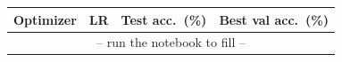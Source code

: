 \begin{tabular}{llcc}
\toprule
Optimizer & LR & Test acc.\ (\%) & Best val acc.\ (\%) \\
\midrule
\multicolumn{4}{c}{-- run the notebook to fill --} \\
\bottomrule
\end{tabular}
